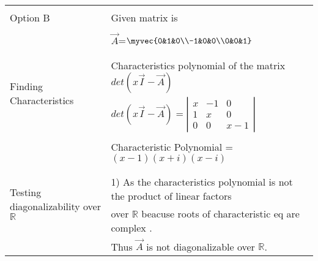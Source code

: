 \begin{longtable}{|l|l|}
\hline \hline
\multirow{3}{*}{Option B} & \\
& Given matrix is  \\
&\\
& $\vec{A}$=$\myvec{0&1&0\\-1&0&0\\0&0&1}$\\
&\\
\hline
\multirow{3}{*}{Finding Characteristics} & \\
&
Characteristics polynomial of the matrix $det(x\vec{I}-\vec{A})$\\ 
polynomial
& $det(x\vec{I}-\vec{A})= \left|
                \begin{array}{ccc}
                x & -1 & 0\\
                1 & x & 0\\
                0 & 0 & x-1
                \end{array} \right|$  \\
&\\
& Characteristic Polynomial = $(x-1)(x+i)(x-i)$\\
&\\
\hline
\multirow{3}{*}{Testing diagonalizability over $\mathbb{R}$} & \\
& 1) As the characteristics  polynomial is not the product of linear factors\\
&over $\mathbb{R}$ beacuse roots of characteristic eq are complex .\\ & Thus $\vec{A}$ is not diagonalizable over $\mathbb{R}$.\\


\end{longtable}
